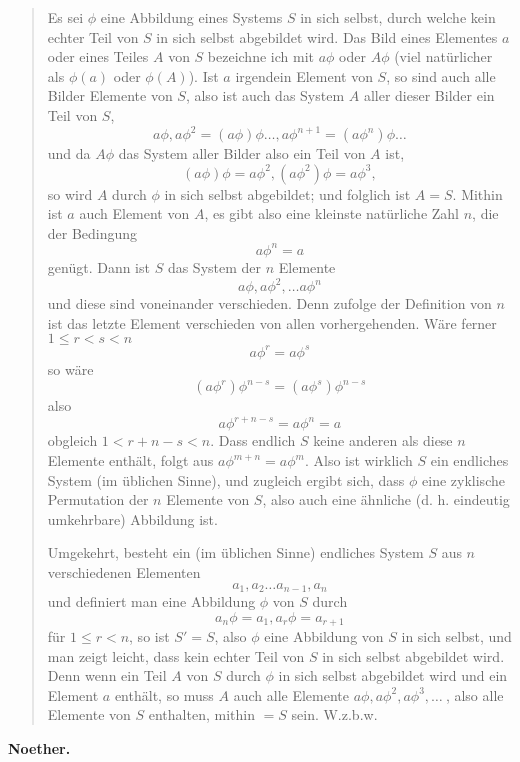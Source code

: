 \documentclass[leqno,hidelinks,10pt]{article}
\theoremstyle{definition}
\begin{document}
\begin{paracol}{2}
\begin{leftcolumn}
\begin{quote}
\hspace{12pt} Es sei $\phi$ eine Abbildung eines Systems $S$ in sich selbst, durch
welche kein echter Teil von $S$ in sich selbst abgebildet wird. Das Bild eines
Elementes $a$ oder eines Teiles $A$ von $S$ bezeichne ich mit $a\phi$ oder $A\phi$
(viel natürlicher als $\phi(a)$ oder $\phi(A)$). Ist $a$ irgendein Element von $S$,
so sind auch alle Bilder Elemente von $S$, also ist auch das System $A$ aller dieser
Bilder ein Teil von $S$,
\[
	a\phi, a\phi^2= (a\phi)\phi \ldots, a\phi^{n+1} = (a\phi^n)\phi \ldots
\]
und da $A\phi$ das System aller Bilder also ein Teil von $A$ ist,
\[
	(a\phi) \phi = a\phi^2, (a\phi^2)\phi = a\phi^3,
\]
so wird $A$ durch $\phi$ in sich selbst abgebildet; und folglich ist $A = S$.
Mithin ist $a$ auch Element von $A$,  es gibt also eine kleinste natürliche Zahl
$n$, die der Bedingung%
\[
	a\phi^n = a
\]
genügt. Dann ist $S$ das System der $n$ Elemente
\[
	a\phi,a\phi^2,\ldots a\phi^n
\]
und diese sind voneinander verschieden. Denn zufolge der Definition von $n$ ist das
letzte Element verschieden von allen vorhergehenden. Wäre ferner $1 \leq r<s < n$%
\[
	a\phi^r = a\phi^s
\]
so wäre
\[
	(a\phi^r)\phi^{n-s} = (a\phi^s) \phi^{n-s}
\]
also
\[
	a\phi^{r+n-s} = a\phi^n = a
\]
obgleich $1 < r + n - s < n$. Dass endlich $S$ keine anderen als diese $n$ Elemente
enthält, folgt aus $a\phi^{m + n} = a\phi^m$. Also ist wirklich $S$ ein endliches
System (im üblichen Sinne), und zugleich ergibt sich, dass $\phi$ eine zyklische
Permutation der $n$ Elemente von $S$, also auch eine ähnliche (d. h. eindeutig
umkehrbare) Abbildung ist.

\hspace{12pt} Umgekehrt, besteht ein (im üblichen Sinne) endliches System $S$ aus
$n$ verschiedenen Elementen
\[
	a_1, a_2 \ldots a_{n-1}, a_n
\]
und definiert man eine Abbildung $\phi$ von $S$ durch
\[
    a_n\phi = a_1, a_r\phi = a_{r+1}
\]
für $1 \leq r < n$, so ist $S' = S$, also $\phi$ eine Abbildung von $S$ in sich
selbst, und man zeigt leicht, dass kein echter Teil von $S$ in sich selbst
abgebildet wird. Denn wenn ein Teil $A$ von $S$ durch $\phi$ in sich selbst
abgebildet wird und ein Element $a$ enthält, so muss $A$ auch alle Elemente
$a\phi, a\phi^2, a\phi^3, \ldots\ $, also alle Elemente von $S$ enthalten,
mithin $= S$ sein. W.z.b.w.\grqq{}
\end{quote}

\begin{flushright} \textbf{Noether.}\end{flushright}



\end{leftcolumn}
\end{paracol}
\end{document}
